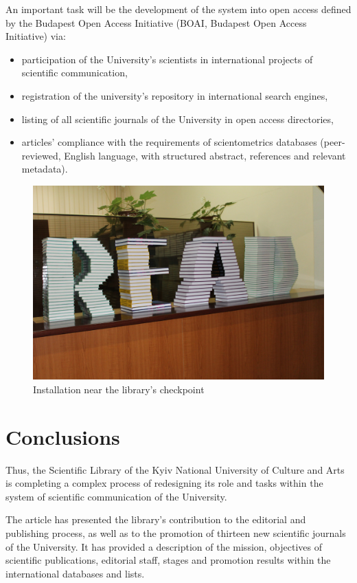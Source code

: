 \documentclass[a4paper,
fontsize=11pt,
oneside,
numbers=noperiodatend,
parskip=half-,
bibliography=totoc,
final
]{scrartcl}
\begin{document}
An important task will be the development of the system into open access
defined by the Budapest Open Access Initiative (BOAI, Budapest Open
Access Initiative) via:

\begin{itemize}
\item
  participation of the University's scientists in international projects
  of scientific communication,
\item
  registration of the university's repository in international search
  engines,
\item
  listing of all scientific journals of the University in open access
  directories,
\item
  articles' compliance with the requirements of scientometrics databases
  (peer-reviewed, English language, with structured abstract, references
  and relevant metadata).
\end{itemize}

\begin{figure}
\centering
\includegraphics{img/abb_3}
\caption{Installation near the library's checkpoint}
\end{figure}

\hypertarget{conclusions}{%
\section{Conclusions}\label{conclusions}}

Thus, the Scientific Library of the Kyiv National University of Culture
and Arts is completing a complex process of redesigning its role and
tasks within the system of scientific communication of the University.

The article has presented the library's contribution to the editorial
and publishing process, as well as to the promotion of thirteen new
scientific journals of the University. It has provided a description of
the mission, objectives of scientific publications, editorial staff,
stages and promotion results within the international databases and
lists.
\end{document}
